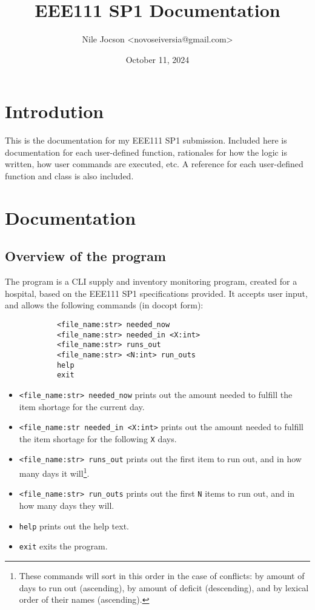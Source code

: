 \documentclass{article}
\title{EEE111 SP1 Documentation}
\author{Nile Jocson \textless{novoseiversia@gmail.com}\textgreater}
\date{October 11, 2024}
\begin{document}
	\maketitle
		\pagebreak



	\tableofcontents
		\pagebreak



	\section{Introdution}
		This is the documentation for my EEE111 SP1 submission. Included here is
		documentation for each user-defined function, rationales for how the logic
		is written, how user commands are executed, etc. A reference for each user-defined
		function and class is also included.
		\newpage



	\section{Documentation}
		\subsection{Overview of the program}\label{overview-of-the-program}
			The program is a CLI supply and inventory monitoring program,
			created for a hospital, based on the EEE111 SP1 specifications
			provided. It accepts user input, and allows the following commands
			(in docopt form):

			\begin{verbatim}
			<file_name:str> needed_now
			<file_name:str> needed_in <X:int>
			<file_name:str> runs_out
			<file_name:str> <N:int> run_outs
			help
			exit
			\end{verbatim}

			\begin{itemize}
				\item \verb|<file_name:str> needed_now| prints out the amount needed to fulfill
			the item shortage for the current day.

				\item \verb|<file_name:str needed_in <X:int>| prints out the amount needed to
				fulfill the item shortage for the following \verb|X| days.

				\item \verb|<file_name:str> runs_out| prints out the first item to run out, and
				in how many days it will\footnote{
					These commands will sort in this order in the case of conflicts:
					by amount of days to run out (ascending),
					by amount of deficit (descending),
					and by lexical order of their names (ascending).
				}.

				\item \verb|<file_name:str> run_outs| prints out the first \verb|N| items to run
				out, and in how many days they will\footnotemark[\value{footnote}].

				\item \verb|help| prints out the help text.

				\item \verb|exit| exits the program.
			\end{itemize}
\end{document}
